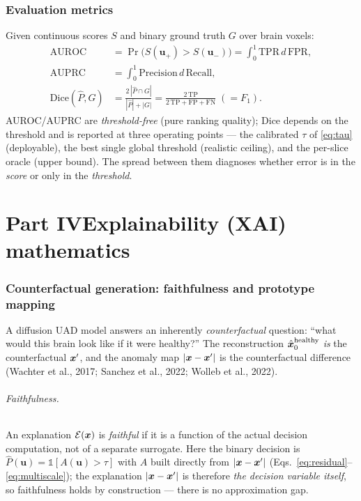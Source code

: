 \section{Evaluation metrics}
Given continuous scores $S$ and binary ground truth $G$ over brain voxels:
\begin{align}
\mathrm{AUROC}&=\Pr\!\big(S(\bm u_+)>S(\bm u_-)\big)
=\int_0^1 \mathrm{TPR}\,d\,\mathrm{FPR}, \\[2pt]
\mathrm{AUPRC}&=\int_0^1 \mathrm{Precision}\,d\,\mathrm{Recall}, \\[2pt]
\mathrm{Dice}(\hat P,G)&=\frac{2\,|\hat P\cap G|}{|\hat P|+|G|}
=\frac{2\,\mathrm{TP}}{2\,\mathrm{TP}+\mathrm{FP}+\mathrm{FN}}\;(=F_1).
\label{eq:metrics}
\end{align}
AUROC/AUPRC are \emph{threshold-free} (pure ranking quality); Dice depends on the
threshold and is reported at three operating points --- the calibrated $\tau$ of
\eqref{eq:tau} (deployable), the best single global threshold (realistic
ceiling), and the per-slice oracle (upper bound). The spread between them
diagnoses whether error is in the \emph{score} or only in the \emph{threshold}.

\part*{Part IV\quad Explainability (XAI) mathematics}
\label{part:xai}

\section{Counterfactual generation: faithfulness and prototype mapping}
A diffusion UAD model answers an inherently \emph{counterfactual} question:
``what would this brain look like if it were healthy?'' The reconstruction
$\hat{\bm{x}}_0^{\text{healthy}}$ \emph{is} the counterfactual $\bm{x}'$, and the anomaly
map $|\bm{x}-\bm{x}'|$ is the counterfactual difference (Wachter et al., 2017; Sanchez et
al., 2022; Wolleb et al., 2022).

\paragraph{Faithfulness.} An explanation $\mathcal E(\bm{x})$ is \emph{faithful} if it
is a function of the actual decision computation, not of a separate surrogate. Here
the binary decision is $\hat P(\bm u)=\mathbb 1[A(\bm u)>\tau]$ with
$A$ built directly from $|\bm{x}-\bm{x}'|$ (Eqs.~\eqref{eq:residual}--\eqref{eq:multiscale});
the explanation $|\bm{x}-\bm{x}'|$
is therefore \emph{the decision variable itself}, so faithfulness holds by
construction --- there is no approximation gap.

